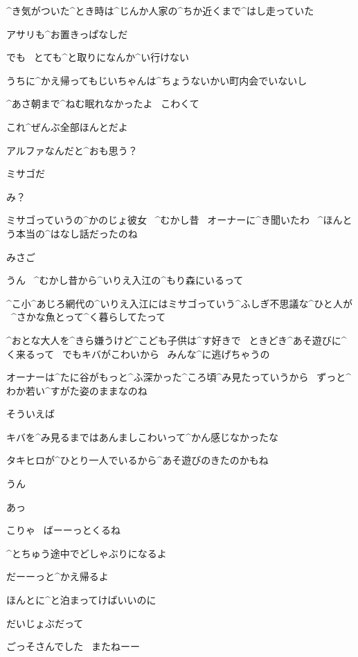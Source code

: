 \page[51]
\Takahiro ^{き}{気}がついた^{とき}{時}は^{じんか}{人家}の^{ちか}{近}くまで^{はし}{走}っていた

\Takahiro アサリも^{お}{置}きっぱなしだ

\Takahiro でも
\ とても^{と}{取}りになんか^{い}{行}けない

\Takahiro うちに^{かえ}{帰}ってもじいちゃんは^{ちょうないかい}{町内会}でいないし

\Takahiro ^{あさ}{朝}まで^{ねむ}{眠}れなかったよ
\ こわくて

\Takahiro これ^{ぜんぶ}{全部}ほんとだよ

\Takahiro アルファなんだと^{おも}{思}う？

\page
\Alpha ミサゴだ

\Takahiro み？

\Alpha ミサゴっていうの^{かのじょ}{彼女}
\ ^{むかし}{昔}
\ オーナーに^{き}{聞}いたわ
\ ^{ほんとう}{本当}の^{はなし}{話}だったのね

\Takahiro みさご

\Alpha うん
\ ^{むかし}{昔}から^{いりえ}{入江}の^{もり}{森}にいるって

\page
\Alpha ^{こ}{小}^{あじろ}{網代}の^{いりえ}{入江}にはミサゴっていう^{ふしぎ}{不思議}な^{ひと}{人}が
\ ^{さかな}{魚}とって^{く}{暮}らしてたって

\Alpha ^{おとな}{大人}を^{きら}{嫌}うけど^{こども}{子供}は^{す}{好}きで
\ ときどき^{あそ}{遊}びに^{く}{来}るって
\ でもキバがこわいから
\ みんな^{に}{逃}げちゃうの

\Alpha オーナーは^{たに}{谷}がもっと^{ふ}{深}かった^{ころ}{頃}^{み}{見}たっていうから
\ ずっと^{わか}{若}い^{すがた}{姿}のままなのね

\page
\Takahiro そういえば

\Takahiro キバを^{み}{見}るまではあんましこわいって^{かん}{感}じなかったな

\Alpha タキヒロが^{ひとり}{一人}でいるから^{あそ}{遊}びのきたのかもね

\Takahiro うん

\Takahiro あっ

\Alpha こりゃ
\ ばーーっとくるね

\page
\Alpha ^{とちゅう}{途中}でどしゃぶりになるよ

\Takahiro だーーっと^{かえ}{帰}るよ

\Alpha ほんとに^{と}{泊}まってけばいいのに

\Takahiro だいじょぶだって

\Takahiro ごっそさんでした
\ またねーー

